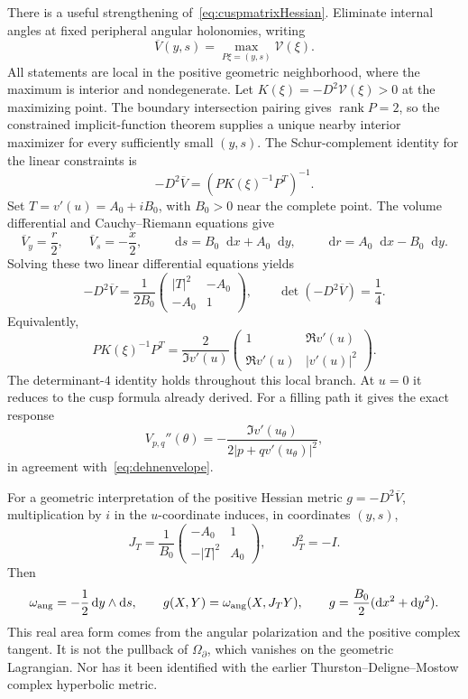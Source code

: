 \documentclass[11pt,a4paper]{article}
\numberwithin{equation}{section}
\theoremstyle{definition}
\theoremstyle{remark}
\newcommand{\dd}{\mathop{}\!\mathrm d}
\begin{document}
There is a useful strengthening of~\eqref{eq:cuspmatrixHessian}.
Eliminate internal angles at fixed peripheral angular holonomies,
writing
\[
 \overline V(y,s)=\max_{P\xi=(y,s)}\mathscr V(\xi).
\]
All statements are local in the positive geometric neighborhood,
where the maximum is interior and nondegenerate. Let
$K(\xi)=-D^2\mathscr V(\xi)>0$ at the maximizing point.
The boundary intersection pairing gives $\operatorname{rank}P=2$,
so the constrained implicit-function theorem supplies a unique nearby
interior maximizer for every sufficiently small $(y,s)$.
The Schur-complement identity for the linear constraints is
\begin{equation}
 -D^2\overline V=(P K(\xi)^{-1}P^T)^{-1}.
 \label{eq:NZreducedHessian}
\end{equation}
Set $T=v'(u)=A_0+iB_0$, with $B_0>0$ near the complete point.
The volume differential and Cauchy--Riemann equations give
\[
 \overline V_y=\frac r2,\qquad
 \overline V_s=-\frac x2,\qquad
 \dd s=B_0\dd x+A_0\dd y,\qquad
 \dd r=A_0\dd x-B_0\dd y.
\]
Solving these two linear differential equations yields
\begin{equation}
 \boxed{-D^2\overline V
 =\frac1{2B_0}\begin{pmatrix}|T|^2&-A_0\\-A_0&1\end{pmatrix},
 \qquad \det(-D^2\overline V)=\frac14.}
 \label{eq:NZMongeAmpere}
\end{equation}
Equivalently,
\begin{equation}
 P K(\xi)^{-1}P^T
  =\frac2{\Im v'(u)}
       \begin{pmatrix}1&\Re v'(u)\\
                       \Re v'(u)&|v'(u)|^2\end{pmatrix}.
 \label{eq:NZnonlinearresponse}
\end{equation}
The determinant-$4$ identity holds throughout this local branch.
At $u=0$ it reduces to the cusp formula already derived.
For a filling path it gives the exact response
\begin{equation}
 V_{p,q}''(\theta)
   =-\frac{\Im v'(u_\theta)}
            {2|p+qv'(u_\theta)|^2},
 \label{eq:NZexactcurvature}
\end{equation}
in agreement with~\eqref{eq:dehnenvelope}.

For a geometric interpretation of the positive Hessian metric
$g=-D^2\overline V$, multiplication by $i$ in the $u$-coordinate
induces, in coordinates $(y,s)$,
\[
 J_T=\frac1{B_0}
      \begin{pmatrix}-A_0&1\\-|T|^2&A_0\end{pmatrix},
 \qquad J_T^2=-I.
\]
Then
\begin{equation}
 \omega_{\rm ang}=-\frac12\dd y\wedge\dd s,\qquad
 g(X,Y)=\omega_{\rm ang}(X,J_TY),\qquad
 g=\frac{B_0}{2}(\dd x^2+\dd y^2).
 \label{eq:NZcompatiblemetric}
\end{equation}
This real area form comes from the angular polarization and the
positive complex tangent. It is not the pullback of
$\Omega_\partial$, which vanishes on the geometric Lagrangian.
Nor has it been identified with the earlier
Thurston--Deligne--Mostow complex hyperbolic metric.
\end{document}
